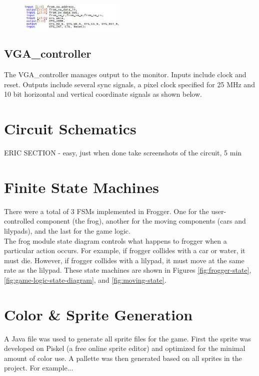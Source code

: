 \documentclass[journal, twocolumn, final,11pt,letterpaper]{IEEEtran}
\begin{document}
	\begin{figure}[h]
		\centering
		\includegraphics[width=0.45\textwidth]{hpiio.jpg}
		\label{fig:hpiio}
	\end{figure}
	
	\subsection{VGA\_controller}
	The VGA\_controller manages output to the monitor.  Inputs include clock and reset. Outputs include several sync signals, a pixel clock specified for 25 MHz and 10 bit horizontal and vertical coordinate signals as shown below.
	


	
\section{Circuit Schematics}
	ERIC SECTION - easy, just when done take screenshots of the circuit, 5 min



\section{Finite State Machines}
There were a total of 3 FSMs implemented in Frogger. One for the user-controlled component (the frog), another for the moving components (cars and lilypads), and the last for the game logic.\\ 

The frog module state diagram controls what happens to frogger when a particular action occurs. For example, if frogger collides with a car or water, it must die. However, if frogger collides with a lilypad, it must move at the same rate as the lilypad. These state machines are shown in Figures \ref{fig:frogger-state}, \ref{fig:game-logic-state-diagram}, and \ref{fig:moving-state}.


\section{Color \& Sprite Generation}
A Java file was used to generate all sprite files for the game. First the sprite was developed on Piskel (a free online sprite editor) and optimized for the minimal amount of color use. A pallette was then generated based on all sprites in the project. For example...
	
\end{document}
